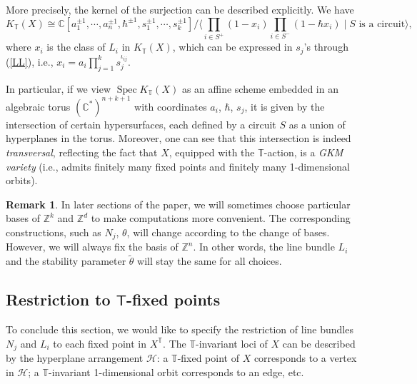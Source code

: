 \documentclass[10pt]{amsart}
\theoremstyle{definition}
\def\ZZ{{\mathbb{Z}}}
\def\CC{{\mathbb{C}}}
\def\TT{\mathbb{T}}
\newcommand{\cH}{\mathcal{H}}
\newcommand{\Spec}{\operatorname{Spec}}
\newcommand{\bT}{\mathsf{T}}
\theoremstyle{definition}
\newtheorem{Remark}[Definition]{Remark}
\numberwithin{equation}{section}
\theoremstyle{Theorem}
\begin{document}
More precisely, the kernel of the surjection can be described explicitly. We have
\begin{equation} \label{K(X)}
K_\TT (X) \cong \CC [ a_1^{\pm 1}, \cdots, a_n^{\pm 1}, \hbar^{\pm 1}, s_1^{\pm 1}, \cdots, s_k^{\pm 1} ] / \langle \prod_{i\in S^+} (1-x_i) \prod_{i\in S^-} (1- \hbar x_i) \mid S \text{ is a circuit} \rangle   ,
\end{equation}
where $x_i$ is the class of $L_i$ in $K_\TT (X)$, which can be expressed in $s_j$'s through (\ref{LL}), i.e., $x_i = a_i \prod_{j=1}^k s_j^{\iota_{ij}}$.

In particular, if we view $\Spec K_\TT (X)$ as an affine scheme embedded in an algebraic torus $(\CC^*)^{n+k+1}$ with coordinates $a_i$, $\hbar$, $s_j$, it is given by the intersection of certain hypersurfaces, each defined by a circuit $S$ as a union of hyperplanes in the torus. Moreover, one can see that this intersection is indeed \emph{transversal}, reflecting the fact that $X$, equipped with the $\TT$-action, is a \emph{GKM variety} (i.e., admits finitely many fixed points and finitely many 1-dimensional orbits).

\begin{Remark}
	In later sections of the paper, we will sometimes choose particular bases of $\ZZ^k$ and $\ZZ^d$ to make computations more convenient. The corresponding constructions, such as $N_j$, $\theta$, will change according to the change of bases. However, we will always fix the basis of $\ZZ^n$. In other words, the line bundle $L_i$ and the stability parameter $\widetilde\theta$  will stay the same for all choices.
\end{Remark}













\subsection{Restriction to $\bT$-fixed points}

To conclude this section, we would like to specify the restriction of line bundles $N_j$ and $L_i$ to each fixed point in $X^\TT$. The $\TT$-invariant loci of $X$ can be described by the hyperplane arrangement $\cH$: a $\TT$-fixed point of $X$ corresponds to a vertex in $\cH$; a $\TT$-invariant 1-dimensional orbit corresponds to an edge, etc.
\end{document}
